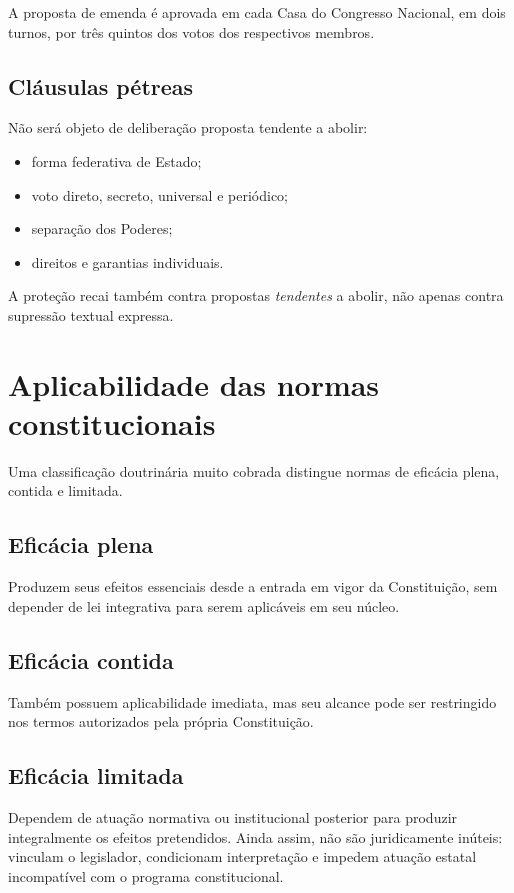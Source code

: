 A proposta de emenda é aprovada em cada Casa do Congresso Nacional, em dois turnos, por três quintos dos votos dos respectivos membros.

\subsection{Cláusulas pétreas}

Não será objeto de deliberação proposta tendente a abolir:
\begin{itemize}
\item forma federativa de Estado;
\item voto direto, secreto, universal e periódico;
\item separação dos Poderes;
\item direitos e garantias individuais.
\end{itemize}

A proteção recai também contra propostas \emph{tendentes} a abolir, não apenas contra supressão textual expressa.

\section{Aplicabilidade das normas constitucionais}

Uma classificação doutrinária muito cobrada distingue normas de eficácia plena, contida e limitada.

\subsection{Eficácia plena}

Produzem seus efeitos essenciais desde a entrada em vigor da Constituição, sem depender de lei integrativa para serem aplicáveis em seu núcleo.

\subsection{Eficácia contida}

Também possuem aplicabilidade imediata, mas seu alcance pode ser restringido nos termos autorizados pela própria Constituição.

\subsection{Eficácia limitada}

Dependem de atuação normativa ou institucional posterior para produzir integralmente os efeitos pretendidos. Ainda assim, não são juridicamente inúteis: vinculam o legislador, condicionam interpretação e impedem atuação estatal incompatível com o programa constitucional.


